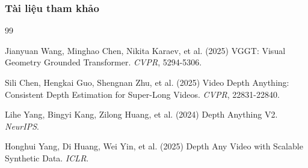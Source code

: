 \documentclass[
	11pt, 
]{beamer}
\begin{document}

\begin{frame}
	\frametitle{Tài liệu tham khảo}
	
	\begin{thebibliography}{99} 
		\footnotesize 
		
			Jianyuan Wang, Minghao Chen, Nikita Karaev, et al. (2025)
			\newblock VGGT: Visual Geometry Grounded Transformer.
			\newblock \emph{CVPR}, 5294-5306.
			
			Sili Chen, Hengkai Guo, Shengnan Zhu, et al. (2025)
			\newblock Video Depth Anything: Consistent Depth Estimation for Super-Long Videos.
			\newblock \emph{CVPR}, 22831-22840.

			Lihe Yang, Bingyi Kang, Zilong Huang, et al. (2024)
			\newblock Depth Anything V2.
			\newblock \emph{NeurIPS}.
			
			Honghui Yang, Di Huang, Wei Yin, et al. (2025)
			\newblock Depth Any Video with Scalable Synthetic Data.
			\newblock \emph{ICLR}.
	\end{thebibliography}
\end{frame}

\end{document}
